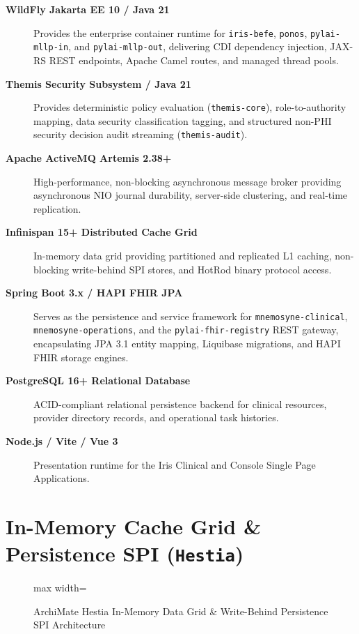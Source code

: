 \begin{description}
    \item[\textbf{WildFly Jakarta EE 10 / Java 21}] Provides the enterprise container runtime for \texttt{iris-befe}, \texttt{ponos}, \texttt{pylai-mllp-in}, and \texttt{pylai-mllp-out}, delivering CDI dependency injection, JAX-RS REST endpoints, Apache Camel routes, and managed thread pools.
    \item[\textbf{Themis Security Subsystem / Java 21}] Provides deterministic policy evaluation (\texttt{themis-core}), role-to-authority mapping, data security classification tagging, and structured non-PHI security decision audit streaming (\texttt{themis-audit}).
    \item[\textbf{Apache ActiveMQ Artemis 2.38+}] High-performance, non-blocking asynchronous message broker providing asynchronous NIO journal durability, server-side clustering, and real-time replication.
    \item[\textbf{Infinispan 15+ Distributed Cache Grid}] In-memory data grid providing partitioned and replicated L1 caching, non-blocking write-behind SPI stores, and HotRod binary protocol access.
    \item[\textbf{Spring Boot 3.x / HAPI FHIR JPA}] Serves as the persistence and service framework for \texttt{mnemosyne-clinical}, \texttt{mnemosyne-operations}, and the \texttt{pylai-fhir-registry} REST gateway, encapsulating JPA 3.1 entity mapping, Liquibase migrations, and HAPI FHIR storage engines.
    \item[\textbf{PostgreSQL 16+ Relational Database}] ACID-compliant relational persistence backend for clinical resources, provider directory records, and operational task histories.
    \item[\textbf{Node.js / Vite / Vue 3}] Presentation runtime for the Iris Clinical and Console Single Page Applications.
\end{description}

\section{In-Memory Cache Grid \& Persistence SPI (\texttt{Hestia})}

\begin{figure}[htbp]
    \centering
    \begin{adjustbox}{max width=\textwidth}
        
    \end{adjustbox}
    \caption{ArchiMate Hestia In-Memory Data Grid \& Write-Behind Persistence SPI Architecture}
    \label{fig:hestia_data_grid}
\end{figure}


